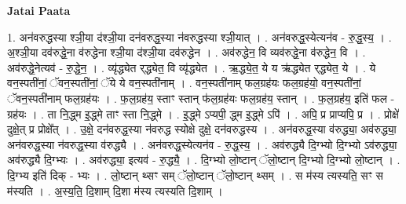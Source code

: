 \documentclass[17pt]{extarticle}
\begin{document}
\textbf{Jatai Paata} \newline

1. अन॑वरुद्धस्या श्ञी॒या द॑श्ञी॒या दन॑वरुद्ध॒स्या न॑वरुद्धस्या श्ञी॒यात् । . अन॑वरुद्ध॒स्येत्यन॑व - रु॒द्ध॒स्य॒ । . अ॒श्ञी॒या दव॑रुद्धे॒ना व॑रुद्धेना श्ञी॒या द॑श्ञी॒या दव॑रुद्धेन । . अव॑रुद्धेन॒ वि व्यव॑रुद्धे॒ना व॑रुद्धेन॒ वि । . अव॑रुद्धे॒नेत्यव॑ - रु॒द्धे॒न॒ । . व्यृ॑द्ध्येत र्‌द्ध्येत॒ वि व्यृ॑द्ध्येत । . ऋ॒द्ध्ये॒त॒ ये य ऋ॑द्ध्येत र्‌द्ध्येत॒ ये । . ये वन॒स्पती॑नां॒ ॅवन॒स्पती॑नां॒ ॅये ये वन॒स्पती॑नाम् । . वन॒स्पती॑नाम् फल॒ग्रह॑यः फल॒ग्रह॑यो॒ वन॒स्पती॑नां॒ ॅवन॒स्पती॑नाम् फल॒ग्रह॑यः । . फ॒ल॒ग्रह॑य॒ स्ताꣳ स्तान् फ॑ल॒ग्रह॑यः फल॒ग्रह॑य॒ स्तान् । . फ॒ल॒ग्रह॑य॒ इति॑ फल - ग्रह॑यः । . ता नि॒द्ध्म इ॒द्ध्मे ताꣳ स्ता नि॒द्ध्मे । . इ॒द्ध्मे ऽप्यपी॒ द्ध्म इ॒द्ध्मे ऽपि॑ । . अपि॒ प्र प्राप्यपि॒ प्र । . प्रोक्षे॑ दुक्षे॒त् प्र प्रोक्षे᳚त् । . उ॒क्षे॒ दन॑वरुद्ध॒स्या न॑वरुद्ध स्योक्षे दुक्षे॒ दन॑वरुद्धस्य । . अन॑वरुद्ध॒स्या व॑रुद्ध्या॒ अव॑रुद्ध्या॒ अन॑वरुद्ध॒स्या न॑वरुद्ध॒स्या व॑रुद्ध्यै । . अन॑वरुद्ध॒स्येत्यन॑व - रु॒द्ध॒स्य॒ । . अव॑रुद्ध्यै दि॒ग्भ्यो दि॒ग्भ्यो ऽव॑रुद्ध्या॒ अव॑रुद्ध्यै दि॒ग्भ्यः । . अव॑रुद्ध्या॒ इत्यव॑ - रु॒द्ध्यै॒ । . दि॒ग्भ्यो लो॒ष्टान् ॅलो॒ष्टान् दि॒ग्भ्यो दि॒ग्भ्यो लो॒ष्टान् । . दि॒ग्भ्य इति॑ दिक् - भ्यः । . लो॒ष्टान् थ्सꣳ सम् ॅलो॒ष्टान् ॅलो॒ष्टान् थ्सम् । . स म॑स्य त्यस्यति॒ सꣳ स म॑स्यति । . अ॒स्य॒ति॒ दि॒शाम् दि॒शा म॑स्य त्यस्यति दि॒शाम् । \newline
\end{document}
